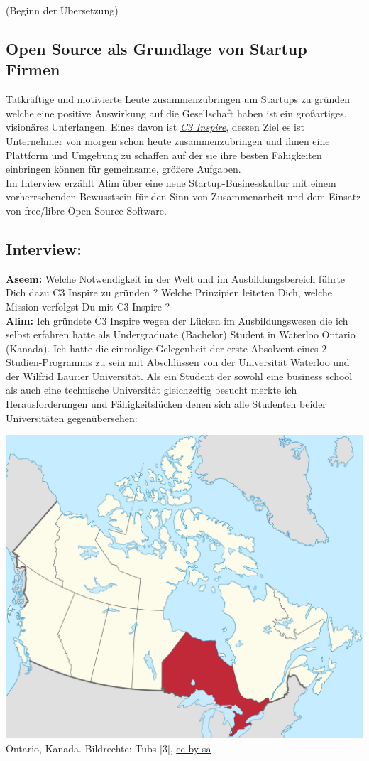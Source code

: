 \documentclass[10pt,a4paper,ngerman,twoside]{article} %
\begin{document}
\begin{multicols}{3}
(Beginn der Übersetzung)\\

\subsection*{Open Source als Grundlage von Startup Firmen}
Tatkräftige und motivierte Leute zusammenzubringen um Startups zu 
gründen welche eine positive Auswirkung auf die Gesellschaft haben ist 
ein großartiges, visionäres Unterfangen. Eines davon ist 
\href{http://c3inspire.com/about/}{\textit{C3 Inspire}}, 
dessen Ziel es ist Unternehmer von morgen schon heute 
zusammenzubringen und ihnen eine Plattform und Umgebung zu schaffen auf 
der sie ihre besten Fähigkeiten einbringen können für gemeinsame, 
größere Aufgaben. \\

Im Interview erzählt Alim über eine neue Startup-Businesskultur mit 
einem vorherrschenden Bewusstsein für den Sinn von Zusammenarbeit und 
dem Einsatz von free/libre Open Source Software.


\subsection*{Interview:} 
\textbf{Aseem:} Welche Notwendigkeit in der Welt und im Ausbildungsbereich 
führte Dich dazu C3 Inspire zu gründen ? Welche Prinzipien leiteten 
Dich, welche Mission verfolgst Du mit C3 Inspire ? 
\\ \textbf{Alim:} Ich gründete C3 Inspire wegen der Lücken im Ausbildungswesen die ich 
selbst erfahren hatte als Undergraduate (Bachelor) Student in Waterloo 
Ontario (Kanada).  Ich hatte die einmalige Gelegenheit der erste 
Absolvent eines 2-Studien-Programms zu sein mit Abschlüssen von der 
Universität Waterloo und der Wilfrid Laurier Universität. Als ein 
Student der sowohl eine business school als auch eine technische 
Universität gleichzeitig besucht merkte ich Herausforderungen und 
Fähigkeitslücken denen sich alle Studenten beider Universitäten 
gegenübersehen: 

\begin{center}
\includegraphics[width=0.7\linewidth]{c3inspire/c3inspire-ontario.png} \\
\footnotesize{Ontario, Kanada. Bildrechte: Tubs [3], \href{https://creativecommons.org/licenses/by-sa/2.5/deed.de}{cc-by-sa}}
\end{center}


\end{multicols}
\end{document}
